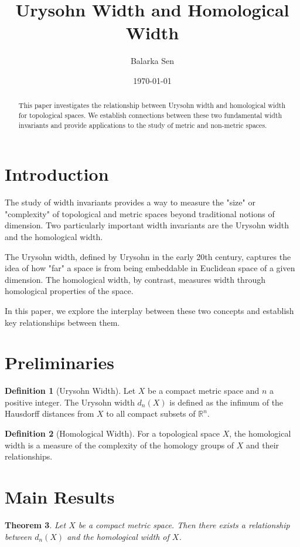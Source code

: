 \documentclass[12pt]{amsart}
\title{Urysohn Width and Homological Width}
\author{Balarka Sen}
\date{\today}
\theoremstyle{plain}
\newtheorem{theorem}{Theorem}[section]
\theoremstyle{definition}
\newtheorem{definition}[theorem]{Definition}
\begin{document}
\begin{abstract}
This paper investigates the relationship between Urysohn width and homological width for topological spaces. We establish connections between these two fundamental width invariants and provide applications to the study of metric and non-metric spaces.
\end{abstract}

\section{Introduction}

The study of width invariants provides a way to measure the "size" or "complexity" of topological and metric spaces beyond traditional notions of dimension. Two particularly important width invariants are the Urysohn width and the homological width.

The Urysohn width, defined by Urysohn in the early 20th century, captures the idea of how "far" a space is from being embeddable in Euclidean space of a given dimension. The homological width, by contrast, measures width through homological properties of the space.

In this paper, we explore the interplay between these two concepts and establish key relationships between them.

\section{Preliminaries}

\begin{definition}
[Urysohn Width]
Let $X$ be a compact metric space and $n$ a positive integer. The Urysohn width $d_n(X)$ is defined as the infimum of the Hausdorff distances from $X$ to all compact subsets of $\mathbb{R}^n$.
\end{definition}

\begin{definition}
[Homological Width]
For a topological space $X$, the homological width is a measure of the complexity of the homology groups of $X$ and their relationships.
\end{definition}

\section{Main Results}

\begin{theorem}
Let $X$ be a compact metric space. Then there exists a relationship between $d_n(X)$ and the homological width of $X$.
\end{theorem}
\end{document}
